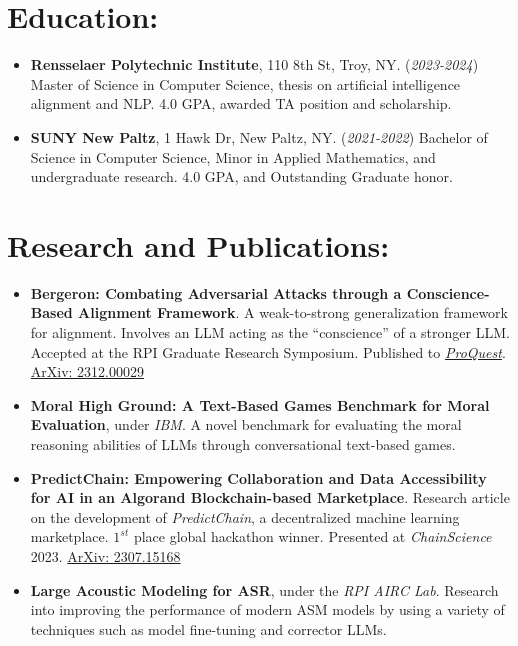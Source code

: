 \documentclass[12pt]{article}
\begin{document}
\section*{Education:}
\begin{itemize}
    \itemsep0em
    \item \textbf{Rensselaer Polytechnic Institute}, 110 8th St, Troy, NY. (\textit{2023-2024}) Master of Science in Computer Science, thesis on artificial intelligence alignment and NLP.  4.0 GPA, awarded TA position and scholarship.
    \item \textbf{SUNY New Paltz}, 1 Hawk Dr, New Paltz, NY. (\textit{2021-2022}) Bachelor of Science in Computer Science, Minor in Applied Mathematics, and undergraduate research. 4.0 GPA, and Outstanding Graduate honor.
\end{itemize}

\section*{Research and Publications:}
\begin{itemize}
    \itemsep0em
    
    \item \textbf{Bergeron: Combating Adversarial Attacks through a Conscience-Based Alignment Framework}.  A weak-to-strong generalization framework for alignment.  Involves an LLM acting as the ``conscience'' of a stronger LLM.  Accepted at the RPI Graduate Research Symposium.  Published to \href{https://www.proquest.com/openview/fc38d3daf9e6be8598ba7ec38aa7d3af/1?pq-origsite=gscholar&cbl=18750&diss=y}{\textit{ProQuest}}.  \href{https://arxiv.org/abs/2312.00029}{ArXiv: 2312.00029}
    
    \item \textbf{Moral High Ground: A Text-Based Games Benchmark for Moral Evaluation}, under \textit{IBM}.  A novel benchmark for evaluating the moral reasoning abilities of LLMs through conversational text-based games.
    
    \item \textbf{PredictChain: Empowering Collaboration and Data Accessibility for AI in an Algorand Blockchain-based Marketplace}.  Research article on the development of \textit{PredictChain}, a decentralized machine learning marketplace.  $1^{st}$ place global hackathon winner.  Presented at \textit{ChainScience} 2023. \href{https://arxiv.org/abs/2307.15168}{ArXiv: 2307.15168}
    
    \item \textbf{Large Acoustic Modeling for ASR}, under the \textit{RPI AIRC Lab}. Research into improving the performance of modern ASM models by using a variety of techniques such as model fine-tuning and corrector LLMs.
    
\end{itemize}
\end{document}
